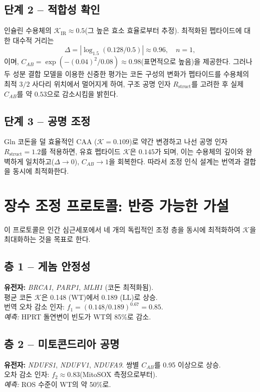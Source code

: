 \documentclass[12pt,a4paper]{article}
\newcommand{\REL}{\mathcal{K}}          %
\begin{document}
	\subsection{단계 2 – 적합성 확인}
	인슐린 수용체의 \(\REL_{\mathrm{IR}} \approx 0.5\)(그 높은 효소 효율로부터 추정). 최적화된 펩타이드에 대한 대수적 거리는
	\[
	\Delta = |\log_{1.5}(0.128/0.5)| \approx 0.96,\quad n=1,
	\]
	이며, \(C_{AB} = \exp(-(0.04)^2/0.08) \approx 0.98\)(표면적으로 높음)을 제공한다. 그러나 두 성분 결합 모델을 이용한 신중한 평가는 코돈 구성의 변화가 펩타이드를 수용체의 최적 \(3/2\) 사다리 위치에서 멀어지게 하여, 구조 공명 인자 \(R_{\mathrm{struct}}\)를 고려한 후 실제 \(C_{AB}\)를 약 \(0.53\)으로 감소시킴을 밝힌다.
	
	\subsection{단계 3 – 공명 조정}
	Gln 코돈을 덜 효율적인 CAA (\(\REL=0.109\))로 약간 변경하고 나선 공명 인자 \(R_{\mathrm{struct}}=1.2\)를 적용하면, 유효 펩타이드 \(\REL\)은 \(0.145\)가 되며, 이는 수용체의 깊이와 완벽하게 일치하고(\(\Delta \to 0\)), \(C_{AB} \to 1\)을 회복한다. 따라서 조정 인식 설계는 번역과 결합을 동시에 최적화한다.
	
	\section{장수 조정 프로토콜: 반증 가능한 가설}
	\label{sec:LL}
	이 프로토콜은 인간 심근세포에서 네 개의 독립적인 조정 층을 동시에 최적화하여 \(\REL\)을 최대화하는 것을 목표로 한다.
	
	\subsection{층 1 – 게놈 안정성}
	\textbf{유전자:} \emph{BRCA1}, \emph{PARP1}, \emph{MLH1} (코돈 최적화됨).\\
	평균 코돈 \(\REL\)은 0.148 (WT)에서 0.189 (LL)로 상승.\\
	번역 오차 감소 인자: \(f_1 = (0.148/0.189)^{0.67} = 0.85\).\\
	\textit{예측:} HPRT 돌연변이 빈도가 WT의 85\%로 감소.
	
	\subsection{층 2 – 미토콘드리아 공명}
	\textbf{유전자:} \emph{NDUFS1}, \emph{NDUFV1}, \emph{NDUFA9}. 쌍별 \(C_{AB}\)를 0.95 이상으로 상승.\\
	오차 감소 인자: \(f_2 \approx 0.83\)(MitoSOX 측정으로부터).\\
	\textit{예측:} ROS 수준이 WT의 약 50\%로.
	
\end{document}
